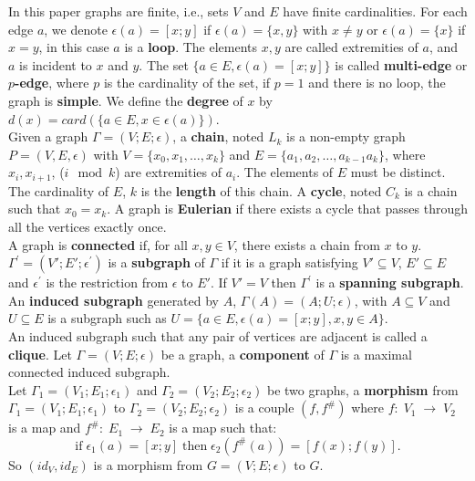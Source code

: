 \documentclass[preprint,12pt,authoryear]{elsarticle}
\theoremstyle{definition}
\begin{document}
In this paper graphs are finite, i.e., sets $V$ and $E$ have
finite cardinalities. For each edge $a$, we denote $\epsilon (a) =
[x; y]$ if $\epsilon (a) =\{x, y\}$ with $x\neq y$ or $\epsilon
(a) =\{x\}$ if $x = y$, in this case  $a$ is a  {\bf loop}. The
elements $x, y$ are called extremities of $a$, and $a$ is incident
to $x$ and $y$.
The set $\{a\in E, \epsilon(a) = [x; y]\}$ is called {\bf multi-edge} or {\bf $p$-edge}, where $p$ is the cardinality of the set, if $p=1$ and there is no loop, the graph is {\bf simple}.
We define the {\bf degree} of $x$ by $d(x) = card(\{a\in E, x\in \epsilon (a) \})$.\\
Given a graph $\Gamma=(V; E; \epsilon)$, a {\bf chain}, noted $L_{k}$ is a
non-empty graph $P =(V, E, \epsilon)$ with $V = \{x_0, x_1, \ldots
, x_k\}$ and $E = \{a_1,a_2, \ldots ,a_{k-1} a_k\}$, where
$x_{i},x_{i+1}$, ($i \mod k$) are extremities of $a_{i}$. The
elements of $E$ must be distinct. The cardinality of $E$, $k$  is the
{\bf length} of this chain.
A {\bf  cycle}, noted $C_{k}$ is a chain such that $x_0= x_k$.  A graph is {\bf Eulerian}  if there exists a cycle that passes through all the vertices exactly once.\\
A graph is {\bf connected} if, for all $x, y\in V$, there exists a chain from $x$ to $y$.\\
$\Gamma^{'} = (V'; E'; \epsilon^{'})$ is a {\bf subgraph} of $\Gamma$ if it is a graph satisfying
$V' \subseteq V$, $E' \subseteq E$ and $\epsilon^{'}$ is the restriction from $\epsilon$ to $E'$.
If $V' = V$ then $\Gamma^{'}$ is a {\bf spanning subgraph}.\\
An {\bf induced subgraph} generated by $A$, $\Gamma(A)=(A; U; \epsilon)$, with $A \subseteq V$ and $U \subseteq E$
is a subgraph such as $U = \{ a\in E, \epsilon (a) = [x; y], x, y \in A \}$.\\
An induced subgraph such that any pair of vertices are adjacent is
called a {\bf clique}. Let $\Gamma=(V; E; \epsilon)$ be a graph,
a {\bf component} of $\Gamma$ is a maximal connected induced
subgraph.\\
Let $\Gamma_{1} =(V_{1}; E_{1}; \epsilon_{1})$ and $\Gamma_{2}
=(V_{2}; E_{2}; \epsilon_{2})$ be two graphs, a {\bf morphism}
from $\Gamma_{1} =(V_{1}; E_{1}; \epsilon_{1})$ to $\Gamma_{2}
=(V_{2}; E_{2}; \epsilon_{2})$ is a couple $(f, f^{\#})$ where
$f:\; V_{1}\;\longrightarrow\; V_{2}$ is a map and $f^{\#}:\;
E_{1}\;\longrightarrow\; E_{2}$ is a map such that:
\[ \text{if}\; \epsilon_{1} (a) = [x; y]\; \text{then}\; \epsilon_{2} (f^{\#}(a)) = [f(x); f(y)]. \]
So $(id_{V}, id_{E})$ is a morphism from $G =(V; E; \epsilon)$ to $G$.\\
\end{document}
